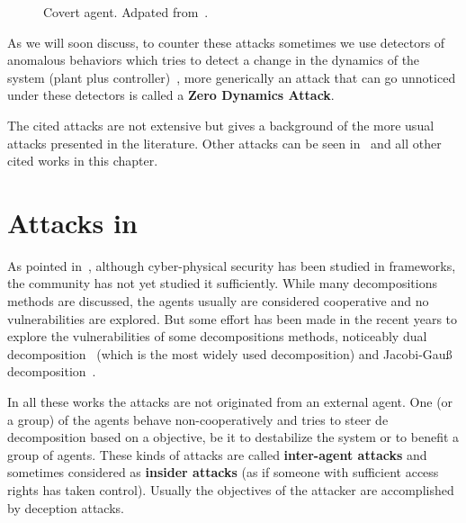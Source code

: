 \documentclass[../main.tex]{subfiles}
\begin{document}
\begin{figure}[h]
{
}
\caption[Covert agent.]{Covert agent. Adpated from~\cite{Smith2015,BarboniEtAl2020}.}\label{fig:covert_attack}
\end{figure}

As we will soon discuss, to counter these attacks sometimes we use detectors of anomalous behaviors which tries to detect a change in the dynamics of the system (plant plus controller)~\cite{TeixeiraEtAl2012,TeixeiraEtAl2015,HoehnZhang2016}, more generically an attack that can go unnoticed under these detectors is called a \textbf{Zero Dynamics Attack}.

The cited attacks are not extensive but gives a background of the more usual attacks presented in the literature.
Other attacks can be seen in~\cite{TeixeiraEtAl2015,ZhangEtAl2021b} and all other cited works in this chapter.

\section{Attacks in \dmpc{}}\label{sec:attacks_in_dmpc}
As pointed in~\cite{ArauzEtAl2021}, although cyber-physical security has been studied in \mpc{} frameworks, the \dmpc{} community has not yet studied it sufficiently.
While many decompositions methods are discussed, the agents usually are considered cooperative and no vulnerabilities are explored.
But some effort has been made in the recent years to explore the vulnerabilities of some decompositions methods, noticeably dual decomposition~\cite{VelardeEtAl2017b,VelardeEtAl2017a,VelardeEtAl2018,AnandutaEtAl2018,AnandutaEtAl2019,AnandutaEtAl2020} (which is the most widely used decomposition) and Jacobi-Gauß decomposition~\cite{ChanfreutEtAl2018}.

In all these works the attacks are not originated from an external agent.
One (or a group) of the agents  behave non-cooperatively and tries to steer de decomposition based on a objective, be it to destabilize the system or to benefit a group of agents.
These kinds of attacks are called \textbf{inter-agent attacks} and sometimes considered as \textbf{insider attacks} (as if someone with sufficient access rights has taken control).
Usually the objectives of the attacker are accomplished by deception attacks.
\end{document}
